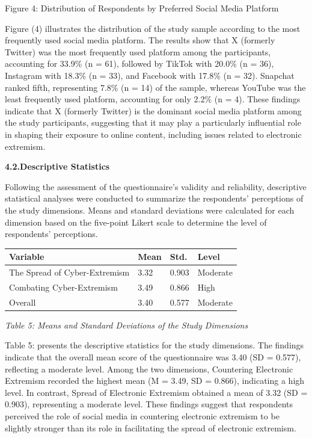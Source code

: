 \documentclass[11pt,a4paper]{article}
\begin{document}
	Figure 4: Distribution of Respondents by Preferred Social Media Platform
	
	Figure (4) illustrates the distribution of the study sample according to the most frequently used social media platform. The results show that X (formerly Twitter) was the most frequently used platform among the participants, accounting for 33.9\% (n = 61), followed by TikTok with 20.0\% (n = 36), Instagram with 18.3\% (n = 33), and Facebook with 17.8\% (n = 32). Snapchat ranked fifth, representing 7.8\% (n = 14) of the sample, whereas YouTube was the least frequently used platform, accounting for only 2.2\% (n = 4). These findings indicate that X (formerly Twitter) is the dominant social media platform among the study participants, suggesting that it may play a particularly influential role in shaping their exposure to online content, including issues related to electronic extremism.
	
	\textbf{4.2.Descriptive Statistics}
	
	Following the assessment of the questionnaire's validity and reliability, descriptive statistical analyses were conducted to summarize the respondents' perceptions of the study dimensions. Means and standard deviations were calculated for each dimension based on the five-point Likert scale to determine the level of respondents' perceptions.
	
	\begin{table}[h]
		\centering
		\begin{tabular}{|l|l|l|l|}
			\hline
			Variable & Mean & Std. & Level \\ \hline
			The Spread of Cyber-Extremism & 3.32 & 0.903 & Moderate \\ \hline
			Combating Cyber-Extremism & 3.49 & 0.866 & High \\ \hline
			Overall & 3.40 & 0.577 & Moderate \\ \hline
		\end{tabular}
	\end{table}
	
	\textit{Table 5: Means and Standard Deviations of the Study Dimensions}
	
	Table 5: presents the descriptive statistics for the study dimensions. The findings indicate that the overall mean score of the questionnaire was 3.40 (SD = 0.577), reflecting a moderate level. Among the two dimensions, Countering Electronic Extremism recorded the highest mean (M = 3.49, SD = 0.866), indicating a high level. In contrast, Spread of Electronic Extremism obtained a mean of 3.32 (SD = 0.903), representing a moderate level. These findings suggest that respondents perceived the role of social media in countering electronic extremism to be slightly stronger than its role in facilitating the spread of electronic extremism.
	
\end{document}
